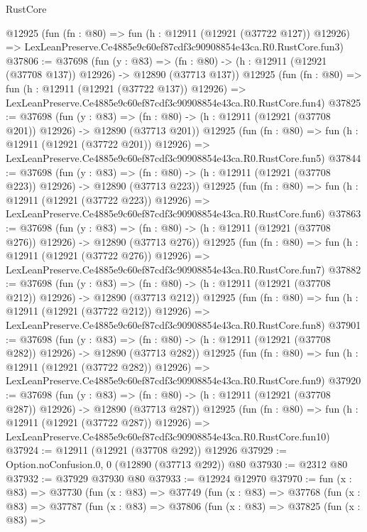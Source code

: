 \begin{lexlean}{RustCore}
\begin{coremodule}
    @12925
    (fun (fn : @80) =>
    fun (h : @12911 (@12921 (@37722 @127)) @12926) =>
    LexLeanPreserve.Ce4885e9c60ef87cdf3c90908854e43ca.R0.RustCore.fun3)
@37806 := @37698
    (fun (y : @83) =>
    (fn : @80) -> (h : @12911 (@12921 (@37708 @137)) @12926) -> @12890 (@37713 @137))
    @12925
    (fun (fn : @80) =>
    fun (h : @12911 (@12921 (@37722 @137)) @12926) =>
    LexLeanPreserve.Ce4885e9c60ef87cdf3c90908854e43ca.R0.RustCore.fun4)
@37825 := @37698
    (fun (y : @83) =>
    (fn : @80) -> (h : @12911 (@12921 (@37708 @201)) @12926) -> @12890 (@37713 @201))
    @12925
    (fun (fn : @80) =>
    fun (h : @12911 (@12921 (@37722 @201)) @12926) =>
    LexLeanPreserve.Ce4885e9c60ef87cdf3c90908854e43ca.R0.RustCore.fun5)
@37844 := @37698
    (fun (y : @83) =>
    (fn : @80) -> (h : @12911 (@12921 (@37708 @223)) @12926) -> @12890 (@37713 @223))
    @12925
    (fun (fn : @80) =>
    fun (h : @12911 (@12921 (@37722 @223)) @12926) =>
    LexLeanPreserve.Ce4885e9c60ef87cdf3c90908854e43ca.R0.RustCore.fun6)
@37863 := @37698
    (fun (y : @83) =>
    (fn : @80) -> (h : @12911 (@12921 (@37708 @276)) @12926) -> @12890 (@37713 @276))
    @12925
    (fun (fn : @80) =>
    fun (h : @12911 (@12921 (@37722 @276)) @12926) =>
    LexLeanPreserve.Ce4885e9c60ef87cdf3c90908854e43ca.R0.RustCore.fun7)
@37882 := @37698
    (fun (y : @83) =>
    (fn : @80) -> (h : @12911 (@12921 (@37708 @212)) @12926) -> @12890 (@37713 @212))
    @12925
    (fun (fn : @80) =>
    fun (h : @12911 (@12921 (@37722 @212)) @12926) =>
    LexLeanPreserve.Ce4885e9c60ef87cdf3c90908854e43ca.R0.RustCore.fun8)
@37901 := @37698
    (fun (y : @83) =>
    (fn : @80) -> (h : @12911 (@12921 (@37708 @282)) @12926) -> @12890 (@37713 @282))
    @12925
    (fun (fn : @80) =>
    fun (h : @12911 (@12921 (@37722 @282)) @12926) =>
    LexLeanPreserve.Ce4885e9c60ef87cdf3c90908854e43ca.R0.RustCore.fun9)
@37920 := @37698
    (fun (y : @83) =>
    (fn : @80) -> (h : @12911 (@12921 (@37708 @287)) @12926) -> @12890 (@37713 @287))
    @12925
    (fun (fn : @80) =>
    fun (h : @12911 (@12921 (@37722 @287)) @12926) =>
    LexLeanPreserve.Ce4885e9c60ef87cdf3c90908854e43ca.R0.RustCore.fun10)
@37924 := @12911 (@12921 (@37708 @292)) @12926
@37929 := Option.noConfusion.{0, 0} (@12890 (@37713 @292)) @80
@37930 := @2312 @80
@37932 := @37929 @37930 @80
@37933 := @12924 @12970
@37970 := fun (x : @83) =>
  @37730
    (fun (x : @83) =>
    @37749
      (fun (x : @83) =>
      @37768
        (fun (x : @83) =>
        @37787
          (fun (x : @83) =>
          @37806
            (fun (x : @83) =>
            @37825
              (fun (x : @83) =>

\end{coremodule}
\end{lexlean}
